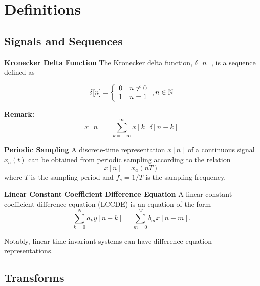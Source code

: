 \chapter{Definitions}


\section{Signals and Sequences}

\begin{defn}{\textbf{Kronecker Delta Function}}
    The Kronecker delta function, $\delta[n]$, is a sequence defined as

    \begin{equation}
        \delta [n] = \left\{ {\begin{array}{*{20}{c}}
            0&{n \ne 0}\\
            1&{n = 1}
            \end{array}} \right.,n \in \bN
    \end{equation}
\end{defn}

\textbf{Remark:}
\begin{equation}
    x[n] = \sum\limits_{k =  - \infty }^\infty  {x[k]\delta [n - k]} 
\end{equation}


\begin{defn}{\textbf{Periodic Sampling}}
A discrete-time representation $x[n]$ of a continuous signal $x_a(t)$ can be obtained from periodic sampling according to the relation
\begin{equation}
x[n] = x_a(nT)
\end{equation}
where $T$ is the sampling period and $f_s=1/T$ is the sampling frequency.
\end{defn}

\begin{defn}{\textbf{Linear Constant Coefficient Difference Equation}}
    A linear constant coefficient difference equation (LCCDE) is an equation of the form 
    \begin{equation}
        \sum\limits_{k=0}^{N} a_k y[n-k] = \sum\limits_{m=0}^{M} b_m x[n-m].
    \end{equation}

    Notably, linear time-invariant systems can have difference equation representations. 
\end{defn}

\section{Transforms}


